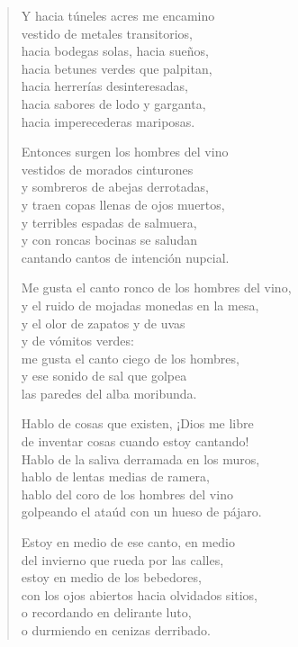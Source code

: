 \documentclass[12pt]{article}
\begin{document}
\begin{verse}
Y hacia túneles acres me encamino\\
vestido de metales transitorios,\\
hacia bodegas solas, hacia sueños,\\
hacia betunes verdes que palpitan,\\
hacia herrerías desinteresadas,\\
hacia sabores de lodo y garganta,\\
hacia imperecederas mariposas.  

Entonces surgen los hombres del vino\\
vestidos de morados cinturones\\
y sombreros de abejas derrotadas,\\
y traen copas llenas de ojos muertos,\\
y terribles espadas de salmuera,\\
y con roncas bocinas se saludan\\
cantando cantos de intención nupcial.  

Me gusta el canto ronco de los hombres del vino,\\
y el ruido de mojadas monedas en la mesa,\\
y el olor de zapatos y de uvas\\
y de vómitos verdes:\\
me gusta el canto ciego de los hombres,\\
y ese sonido de sal que golpea\\
las paredes del alba moribunda.  

Hablo de cosas que existen, ¡Dios me libre\\
de inventar cosas cuando estoy cantando!\\
Hablo de la saliva derramada en los muros,\\
hablo de lentas medias de ramera,\\
hablo del coro de los hombres del vino\\
golpeando el ataúd con un hueso de pájaro.  

Estoy en medio de ese canto, en medio\\
del invierno que rueda por las calles,\\
estoy en medio de los bebedores,\\
con los ojos abiertos hacia olvidados sitios,\\
o recordando en delirante luto,\\
o durmiendo en cenizas derribado.  


\end{verse}
\end{document}
